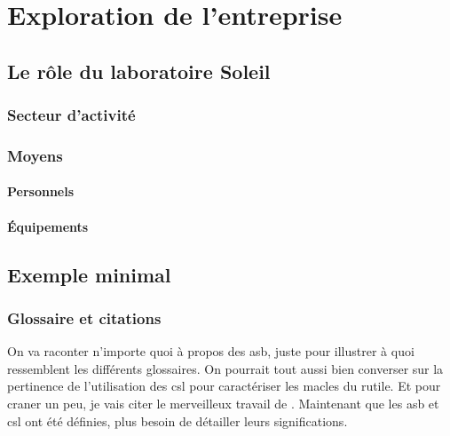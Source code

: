 \chapter{Exploration de l'entreprise}
	\minitoc


\section{Le rôle du laboratoire Soleil}

	\subsection{Secteur d'activit\'e}
	\subsection{Moyens}
		\subsubsection{Personnels}
		\subsubsection{Équipements}



\section{Exemple minimal}
	\subsection{Glossaire et citations}
		On va raconter n'importe quoi à propos des \gls{asb}, juste pour illustrer à quoi ressemblent les différents glossaires. On pourrait tout aussi bien converser sur la pertinence de l'utilisation des \gls{csl} pour caractériser les \glspl{macle} du \gls{rutile}. Et pour craner un peu, je vais citer le merveilleux travail de \citet{depriester2014thermomechanical}. Maintenant que les \gls{asb} et \gls{csl} ont été définies, plus besoin de détailler leurs significations.
		
